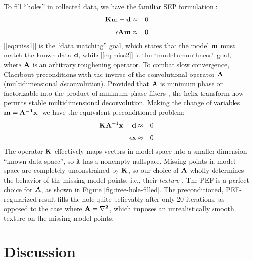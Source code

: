 	To fill ``holes'' in collected data, we have the familiar SEP formulation 
	{\small \cite[]{gee}}:
	\begin{eqnarray}
		\bf Km - d &\approx& 0 \label{eq:miss1} \\[0.05in]
		\bf \epsilon Am &\approx& 0 \label{eq:miss2}
	\end{eqnarray}
	[\ref{eq:miss1}] is the ``data matching'' goal, which states that the model $\bf m$
	must match the known data $\bf d$, while [\ref{eq:miss2}] is the ``model smoothness''
	goal, where $\bf A$ is an arbitrary roughening operator.  To combat slow convergence,
	Claerbout {\small {}} preconditions with the inverse of the convolutional 
	operator $\bf A$ (multidimensional {\em de}convolution).  Provided that
	$\bf A$ is minimum phase or factorizable into the product of minimum phase filters
	\cite[]{Sava.sep.97.paul1},
	the helix transform now permits stable multidimensional deconvolution.  Making
	the change of variables $\bf m = A^{-1}x$, we have the equivalent preconditioned problem:
	\begin{eqnarray}
		\bf KA^{-1}x - d &\approx& 0 \label{eq:prec1} \\[0.05in]
		\bf \epsilon x &\approx& 0 \label{eq:prec2}
	\end{eqnarray}
	The operator $\bf K$ effectively maps vectors in model space into 
	a smaller-dimension ``known data space'', so it has a nonempty nullspace.
	Missing points in model space are completely unconstrained by $\bf K$, so
	our choice of $\bf A$ wholly determines the behavior of the missing model points, i.e.,
	their {\em texture} {\small \cite[]{Fomel.sep.95.sergey1}}.  
	The PEF is a perfect choice for $\bf A$, as shown in Figure
	\ref{fig:tree-hole-filled}.  The preconditioned, PEF-regularized result fills the
	hole quite believably after only 20 iterations, as opposed to the case where
	$\bf A = \nabla^2$, which imposes an unrealistically smooth texture on the missing 
	model points.  


\section{ Discussion}

